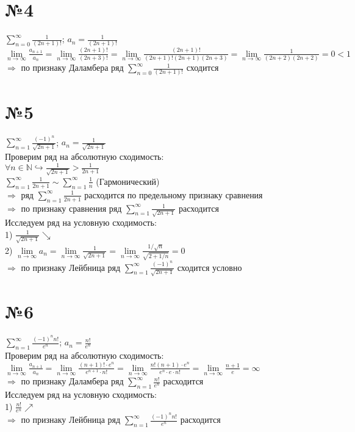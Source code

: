 \documentclass[a4paper,12pt]{article}
\begin{document}
\section*{№4}
	$\sum\limits_{n=0}^{\infty} \frac{1}{(2n+1)!}$;
	$a_n = \frac{1}{(2n+1)!}$\\
	$
	\lim\limits_{n\to\infty} \frac{a_{n+1}}{a_n} =
	\lim\limits_{n\to\infty} \frac{(2n+1)!}{(2n+3)!}=
	\lim\limits_{n\to\infty} \frac{(2n+1)!}{(2n+1)!(2n+1)(2n+3)} =
	\lim\limits_{n\to\infty} \frac{1}{(2n+2)(2n+2)} = 0 < 1
	$\\
	$\Rightarrow$ по признаку Даламбера ряд 
	$\sum\limits_{n=0}^{\infty} \frac{1}{(2n+1)!}$ сходится
	
\section*{№5}
	$\sum\limits_{n=1}^{\infty} \frac{(-1)^n}{\sqrt{2n+1}}$;
	$a_n = \frac{1}{\sqrt{2n+1}}$\\
	Проверим ряд на абсолютную сходимость:\\
	$\forall n \in\mathbb{N} \hookrightarrow \frac{1}{\sqrt{2n+1}} > \frac{1}{2n+1}$\\
	$\sum\limits_{n=1}^{\infty} \frac{1}{2n+1} \sim \sum\limits_{n=1}^{\infty} \frac{1}{n}$ (Гармонический)\\
	$\Rightarrow$ ряд $\sum\limits_{n=1}^{\infty} \frac{1}{2n+1}$ расходится по предельному признаку сравнения\\
	$\Rightarrow$ по признаку сравнения ряд $\sum\limits_{n=1}^{\infty} \frac{1}{\sqrt{2n+1}}$ расходится\\
	Исследуем ряд на условную сходимость:\\
	1) $\frac{1}{\sqrt{2n+1}} \searrow$\\
	2) $\lim\limits_{n\to\infty} a_n = 
	\lim\limits_{n\to\infty} \frac{1}{\sqrt{2n+1}} =
	\lim\limits_{n\to\infty} \frac{1/\sqrt{n}}{\sqrt{2+1/n}} = 0$\\
	$\Rightarrow$ по признаку Лейбница ряд 
	$\sum\limits_{n=1}^{\infty} \frac{(-1)^n}{\sqrt{2n+1}}$ сходится условно
	
\section*{№6}
	$\sum\limits_{n=1}^{\infty} \frac{(-1)^nn!}{e^n}$;
	$a_n = \frac{n!}{e^n}$\\
	Проверим ряд на абсолютную сходимость:\\
	$\lim\limits_{n\to\infty} \frac{a_{n+1}}{a_n} =
	\lim\limits_{n\to\infty} \frac{(n+1)!\cdot e^n}{e^{n+1}\cdot n!} =
	\lim\limits_{n\to\infty} \frac{n!(n+1)\cdot e^n}{e^n\cdot e\cdot n!} = 
	\lim\limits_{n\to\infty} \frac{n+1}{e} = \infty
	$\\
	$\Rightarrow$ по признаку Даламбера ряд $\sum\limits_{n=1}^{\infty} \frac{n!}{e^n}$ расходится\\
	Исследуем ряд на условную сходимость:\\
	1) $\frac{n!}{e^n} \nearrow$\\
	$\Rightarrow$ по признаку Лейбница ряд 
	$\sum\limits_{n=1}^{\infty} \frac{(-1)^nn!}{e^n}$ расходится
	
\end{document}
